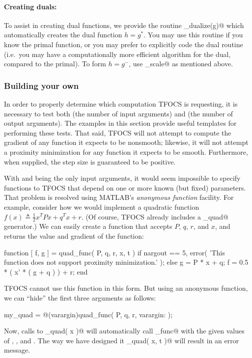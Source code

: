 \documentclass{article}
\newcommand\thalf{{\textstyle\frac{1}{2}}}
\newcommand{\<}{\langle}
\renewcommand{\>}{\rangle}
\begin{document}
\paragraph{Creating duals:}
To assist in creating dual functions, we provide the routine \verb@prox_dualize(g)@ which automatically creates the dual function $h=g^*$. You may use this routine if you know the primal function, or you may prefer to explicitly code the dual routine (i.e.~you may have a computationally more efficient algorithm for the dual, compared to the primal). To form $h=g^{-}$, use  \verb@prox_scale@ as mentioned above.

\subsubsection{Building your own}
\label{sec:smoothb}

In order to properly determine which computation TFOCS is requesting,
it is necessary to test both \verb@nargin@ (the number of input arguments)
and \verb@nargout@ (the number of output arguments). The examples
in this section provide useful templates for performing these tests.
That said,  TFOCS will not attempt to compute the gradient of any function
it expects to be nonsmooth; likewise, it will not attempt a proximity
minimization for any function it expects to be smooth. Furthermore,
when supplied, the step size \verb@t@ is guaranteed to be positive.

With \verb@x@ and \verb@t@ being the only input arguments,
it would seem impossible
to specify functions to TFOCS that depend on one or more known 
(but fixed) parameters. That problem is resolved using MATLAB's
\emph{anonymous function} facility. For example, consider how we 
would implement a quadratic function $f(x)\triangleq \thalf x^TPx+q^Tx+r$.
(Of course, TFOCS already includes a \verb@smooth_quad@ generator.)
We can easily create a
function that accepts $P$, $q$, $r$, and $x$, and returns the
value and gradient of the function:
\begin{code}
	function [ f, g ] = quad_func( P, q, r, x, t )
	if nargout == 5,
	    error( 'This function does not support proximity minimization.' );
	else
	    g = P * x + q;
	    f = 0.5 * ( x' * ( g + q ) ) + r;
	end
\end{code}
TFOCS cannot use this function in this form.
But using an anonymous function, we can ``hide'' the first three 
arguments as follows:
\begin{code}
	my_quad = @(varargin)quad_func( P, q, r, varargin{:} );
\end{code}
Now, calls to \verb@my_quad( x )@ will automatically call \verb@quad_func@
with the given values of \verb@P@, \verb@q@, and \verb@r@. The way we
have designed it \verb@my_quad( x, t )@ will result in an error
message.
\end{document}
